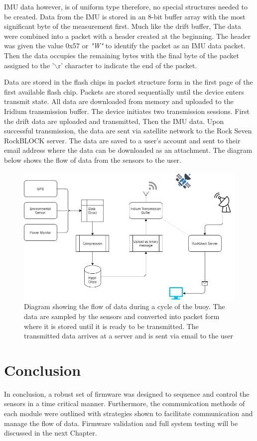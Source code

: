IMU data however, is of uniform type therefore, no special structures needed to be created. Data from the IMU is stored in an 8-bit buffer array with the most significant byte of the measurement first. Much like the drift buffer, The data were combined into a packet with a header created at the beginning. The header was given the value 0x57 or \textit{"W"} to identify the packet as an IMU data packet. Then the data occupies the remaining bytes with the final byte of the packet assigned to the '$\backslash$r' character to indicate the end of the packet. \par 

Data are stored in the flash chips in packet structure form in the first page of the first available flash chip. Packets are stored sequentially until the device enters transmit state. All data are downloaded from memory and uploaded to the Iridium transmission buffer. The device initiates two transmission sessions. First the drift data are uploaded and transmitted, Then the IMU data. Upon successful transmission, the data are sent via satellite network to the Rock Seven RockBLOCK server. The data are saved to a user's account and sent to their email address where the data can be downloaded as an attachment. The diagram below shows the flow of data from the sensors to the user.

\begin{figure}[H]
	\centering
	\includegraphics[scale = 0.5]{Data Flow Diagram.png}
	\caption{Diagram showing the flow of data during a cycle of the buoy. The data are sampled by the sensors and converted into packet form where it is stored until it is ready to be transmitted. The transmitted data arrives at a server and is sent via email to the user}
	\label{fig:data_flow}
\end{figure}

\section{Conclusion}

In conclusion, a robust set of firmware was designed to sequence and control the sensors in a time critical manner. Furthermore, the communication methods of each module were outlined with strategies shown to facilitate communication and manage the flow of data. Firmware validation and full system testing will be discussed in the next Chapter.